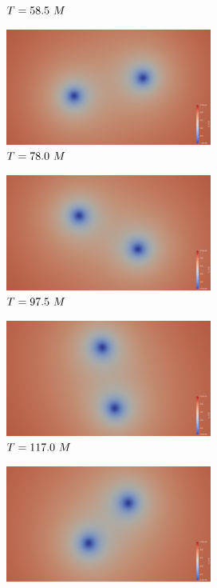 \documentclass[landscape]{a0poster}
\begin{document}
\begin{textblock}{62}
\begin{textblock}{40}
\begin{figure}
\begin{subfigure}{0.0714\textwidth}
			\caption{\small ${T}=58.5~M$}
		\end{subfigure}
		\begin{subfigure}{0.0714\textwidth}
			\centering
			\includegraphics[height=1.5in]{figs/AE/r1/img_slice_000040.png}
			\caption{\small ${T}=78.0~M$}
		\end{subfigure}
		\begin{subfigure}{0.0714\textwidth}
			\centering
			\includegraphics[height=1.5in]{figs/AE/r1/img_slice_000050.png}
			\caption{\small ${T}=97.5~M$}
		\end{subfigure}
		\begin{subfigure}{0.0714\textwidth}
			\centering
			\includegraphics[height=1.5in]{figs/AE/r1/img_slice_000060.png}
			\caption{\small ${T}=117.0~M$}
		\end{subfigure}
		\begin{subfigure}{0.0714\textwidth}
			\centering
			\includegraphics[height=1.5in]{figs/AE/r1/img_slice_000070.png}

\end{subfigure}
\end{figure}
\end{textblock}
\end{textblock}
\end{document}
